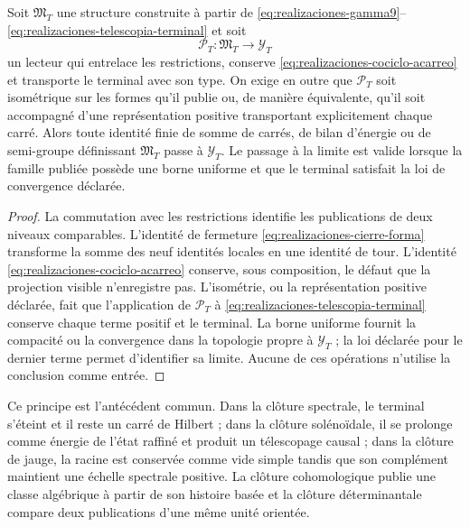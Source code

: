 \begin{proposition}
\label{prop:realizaciones-transporte-especializado}
Soit \(\mathfrak M_T\) une structure construite à partir de
\eqref{eq:realizaciones-gamma9}--\eqref{eq:realizaciones-telescopia-terminal}
et soit
\[
 \mathcal P_T:\mathfrak M_T\longrightarrow\mathcal Y_T
\]
un lecteur qui entrelace les restrictions, conserve
\eqref{eq:realizaciones-cociclo-acarreo} et transporte le terminal avec son type.
On exige en outre que \(\mathcal P_T\) soit isométrique sur les formes qu'il
publie ou, de manière équivalente, qu'il soit accompagné d'une représentation
positive transportant explicitement chaque carré. Alors toute identité
finie de somme de carrés, de bilan d'énergie ou de semi-groupe définissant
\(\mathfrak M_T\) passe à \(\mathcal Y_T\). Le passage à la
limite est valide lorsque la famille publiée possède une borne uniforme et que le
terminal satisfait la loi de convergence déclarée.
\end{proposition}

\begin{proof}
La commutation avec les restrictions identifie les publications de deux
niveaux comparables. L'identité de fermeture
\eqref{eq:realizaciones-cierre-forma} transforme la somme des neuf
identités locales en une identité de tour. L'identité
\eqref{eq:realizaciones-cociclo-acarreo} conserve, sous composition, le
défaut que la projection visible n'enregistre pas. L'isométrie, ou la
représentation positive déclarée, fait que l'application de \(\mathcal P_T\) à
\eqref{eq:realizaciones-telescopia-terminal} conserve chaque terme positif
et le terminal. La borne uniforme fournit la compacité ou la convergence dans la
topologie propre à \(\mathcal Y_T\) ; la loi déclarée pour le dernier
terme permet d'identifier sa limite. Aucune de ces opérations n'utilise
la conclusion comme entrée.
\end{proof}

Ce principe est l'antécédent commun. Dans la clôture spectrale, le terminal
s'éteint et il reste un carré de Hilbert ; dans la clôture solénoïdale, il se prolonge
comme énergie de l'état raffiné et produit un télescopage causal ; dans la
clôture de jauge, la racine est conservée comme vide simple tandis que son complément
maintient une échelle spectrale positive. La clôture cohomologique publie une
classe algébrique à partir de son histoire basée et la clôture déterminantale compare
deux publications d'une même unité orientée.



